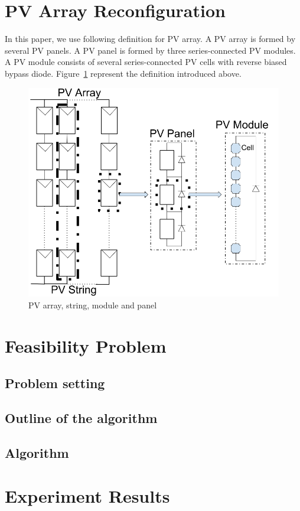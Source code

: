 \documentclass[journal]{IEEEtran}
\begin{document}
\section{PV Array Reconfiguration}
In this paper, we use following definition for PV array.
A PV array is formed by several PV panels.
A PV panel is formed by three series-connected PV modules.
A PV module consists of several series-connected PV cells with reverse biased bypass diode.
Figure~\ref{fig:array} represent the definition introduced above.
\begin{figure}[ht]
\centerline{\includegraphics[width=\linewidth]{fig/module.png}}
\caption[]{PV array, string, module and panel}
\label{fig:array}
\end{figure}

\section{Feasibility Problem}
\subsection{Problem setting}
\subsection{Outline of the algorithm}
\subsection{Algorithm}
\section{Experiment Results}
\end{document}

